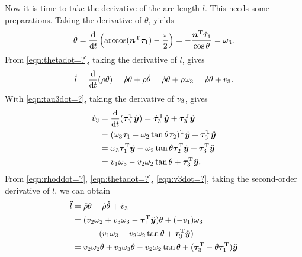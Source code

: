 \documentclass[5p,authoryear,preprint]{elsarticle}\linenofalse
\begin{document}
Now it is time to take the derivative of the arc length $l$.
This needs some preparations.
Taking the derivative of $\theta$, yields
\begin{align}\label{eqn:thetadot=?}
	\dot{\theta}=\frac{\mathrm d}{\mathrm dt}\left(\arccos(\bm{n}^\mathrm{T}\bm{\tau}_1)-\frac\pi2\right)=-\frac{\bm{n}^\mathrm{T}\dot{\bm{\tau}}_1}{\cos\theta}=\omega_3.
\end{align}
From \eqref{eqn:thetadot=?}, taking the derivative of $l$, gives
\begin{align*}
	\dot{l}=\frac{\mathrm d}{\mathrm dt}(\rho\theta)=\dot{\rho}\theta+\rho\dot{\theta}=\dot{\rho}\theta+\rho\omega_3=\dot{\rho}\theta+v_3.
\end{align*}
With \eqref{eqn:tau3dot=?}, taking the derivative of $v_3$, gives
\begin{equation}\begin{aligned}\label{eqn:v3dot=?}
		\dot{v}_3&=\frac{\mathrm d}{\mathrm dt}(\bm{\tau}_3^\mathrm{T}\dot{\bm{y}})=\dot{\bm{\tau}}_3^\mathrm{T}\dot{\bm{y}}+\bm{\tau}_3^\mathrm{T}\ddot{\bm{y}}\\
		&=(\omega_3\bm{\tau}_1-\omega_2\tan\theta\bm{\tau}_2)^{\mathrm{T}}\dot{\bm{y}}+\bm{\tau}_3^\mathrm{T}\ddot{\bm{y}}\\
		&=\omega_3\bm{\tau}_1^\mathrm{T}\dot{\bm{y}}-\omega_2\tan\theta\bm{\tau}_2^\mathrm{T}\dot{\bm{y}}+\bm{\tau}_3^\mathrm{T}\ddot{\bm{y}}\\
		&=v_1\omega_3-v_2\omega_2\tan\theta+\bm{\tau}_3^\mathrm{T}\ddot{\bm{y}}.
\end{aligned}\end{equation}
From \eqref{eqn:rhoddot=?}, \eqref{eqn:thetadot=?}, \eqref{eqn:v3dot=?},
taking the second-order derivative of $l$, we can obtain
\begin{equation}\label{eqn:lddot=?}
	\begin{aligned}
		\ddot{l}&=\ddot{\rho}\theta+\dot{\rho}\dot{\theta}+\dot{v}_3\\
		&=(v_2\omega_2+v_3\omega_3-\bm{\tau}_1^\mathrm{T}\ddot{\bm{y}})\theta+(-v_1)\omega_3\\
		&\qquad+(v_1\omega_3-v_2\omega_2\tan\theta+\bm{\tau}_3^\mathrm{T}\ddot{\bm{y}})\\
		&=v_2\omega_2\theta+v_3\omega_3\theta-v_2\omega_2\tan\theta+(\bm{\tau}_3^\mathrm{T}-\theta\bm{\tau}_1^\mathrm{T})\ddot{\bm{y}}
\end{aligned}\end{equation}
\end{document}
